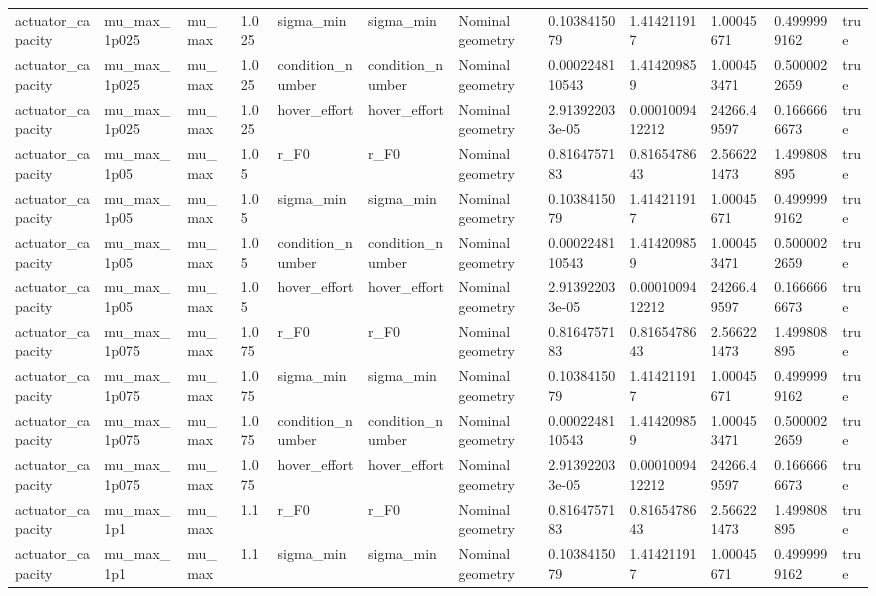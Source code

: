 \begin{tabular}{@{}llllllllllll@{}}
actuator\_capacity & mu\_max\_1p025 & mu\_max & 1.025 & sigma\_min & sigma\_min & Nominal geometry & 0.1038415079 & 1.414211917 & 1.00045671 & 0.4999999162 & true \\
actuator\_capacity & mu\_max\_1p025 & mu\_max & 1.025 & condition\_number & condition\_number & Nominal geometry & 0.0002248110543 & 1.414209859 & 1.000453471 & 0.5000022659 & true \\
actuator\_capacity & mu\_max\_1p025 & mu\_max & 1.025 & hover\_effort & hover\_effort & Nominal geometry & 2.913922033e-05 & 0.0001009412212 & 24266.49597 & 0.1666666673 & true \\
actuator\_capacity & mu\_max\_1p05 & mu\_max & 1.05 & r\_F0 & r\_F0 & Nominal geometry & 0.8164757183 & 0.8165478643 & 2.566221473 & 1.499808895 & true \\
actuator\_capacity & mu\_max\_1p05 & mu\_max & 1.05 & sigma\_min & sigma\_min & Nominal geometry & 0.1038415079 & 1.414211917 & 1.00045671 & 0.4999999162 & true \\
actuator\_capacity & mu\_max\_1p05 & mu\_max & 1.05 & condition\_number & condition\_number & Nominal geometry & 0.0002248110543 & 1.414209859 & 1.000453471 & 0.5000022659 & true \\
actuator\_capacity & mu\_max\_1p05 & mu\_max & 1.05 & hover\_effort & hover\_effort & Nominal geometry & 2.913922033e-05 & 0.0001009412212 & 24266.49597 & 0.1666666673 & true \\
actuator\_capacity & mu\_max\_1p075 & mu\_max & 1.075 & r\_F0 & r\_F0 & Nominal geometry & 0.8164757183 & 0.8165478643 & 2.566221473 & 1.499808895 & true \\
actuator\_capacity & mu\_max\_1p075 & mu\_max & 1.075 & sigma\_min & sigma\_min & Nominal geometry & 0.1038415079 & 1.414211917 & 1.00045671 & 0.4999999162 & true \\
actuator\_capacity & mu\_max\_1p075 & mu\_max & 1.075 & condition\_number & condition\_number & Nominal geometry & 0.0002248110543 & 1.414209859 & 1.000453471 & 0.5000022659 & true \\
actuator\_capacity & mu\_max\_1p075 & mu\_max & 1.075 & hover\_effort & hover\_effort & Nominal geometry & 2.913922033e-05 & 0.0001009412212 & 24266.49597 & 0.1666666673 & true \\
actuator\_capacity & mu\_max\_1p1 & mu\_max & 1.1 & r\_F0 & r\_F0 & Nominal geometry & 0.8164757183 & 0.8165478643 & 2.566221473 & 1.499808895 & true \\
actuator\_capacity & mu\_max\_1p1 & mu\_max & 1.1 & sigma\_min & sigma\_min & Nominal geometry & 0.1038415079 & 1.414211917 & 1.00045671 & 0.4999999162 & true \\

\end{tabular}
